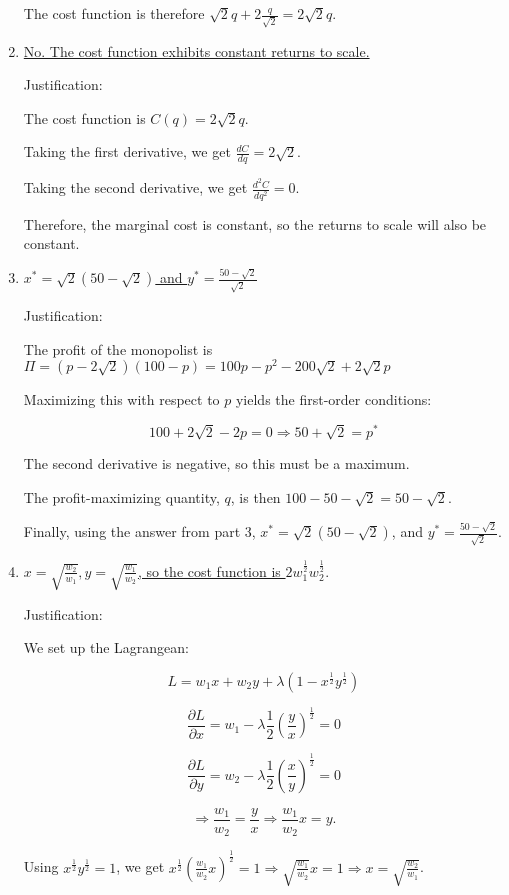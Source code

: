 \documentclass{article}
\newenvironment{solution}{\color{red}}{\color{black}}
\begin{document}
\begin{solution}
\begin{enumerate}
The cost function is therefore $\sqrt{2}q+2\frac{q}{\sqrt{2}}=2\sqrt{2}q$. 

\item\underline{No. The cost function exhibits constant returns to scale.}

Justification:

The cost function is $C(q) =2\sqrt{2}q$. 

Taking the first derivative, we get  $\frac{d C}{d q}=2\sqrt{2}.$

Taking the second derivative, we get  $\frac{d^2 C}{d q^2}=0$.

Therefore, the marginal cost is constant, so the returns to scale will also be constant.

\item\underline{$x^{*}=\sqrt{2}(50-\sqrt{2})$ and $y^{*}=\frac{50-\sqrt{2}}{\sqrt{2}}$}

Justification:

The profit of the monopolist is $\Pi=(p-2\sqrt{2})(100-p)=100p-p^2-200\sqrt{2}+2\sqrt{2}p$

Maximizing this with respect to $p$ yields the first-order conditions:

\[ 100+2\sqrt{2}-2p=0 \Rightarrow 50+\sqrt{2}=p^{*} \]

The second derivative is negative, so this must be a maximum.

The profit-maximizing quantity, $q$, is then $100-50-\sqrt{2}=50-\sqrt{2}$.

Finally, using the answer from part 3, $x^{*}=\sqrt{2}(50-\sqrt{2})$, and $y^{*}=\frac{50-\sqrt{2}}{\sqrt{2}}$.

\item\underline{ $x=\sqrt{\frac{w_2}{w_1}}, y=\sqrt{\frac{w_1}{w_2}}$, so the cost function is $2w_1^\frac12 w_2^\frac12. $}

Justification:

We set up the Lagrangean:

\[ L=w_1 x+w_2 y+\lambda\left( 1-x^\frac12 y^\frac12 \right) \]

\[ \frac{\partial L}{\partial x}=w_1-\lambda\frac12\left( \frac{y}{x} \right)^\frac12=0 \]

\[ \frac{\partial L}{\partial y}=w_2-\lambda\frac12\left( \frac{x}{y} \right)^\frac12=0 \]

\[ \Rightarrow \frac{w_1}{w_2}=\frac{y}{x} \Rightarrow \frac{w_1}{w_2}x=y. \]

Using $x^\frac12 y^\frac12=1$, we get $x^\frac12\left( \frac{w_1}{w_2}x \right)^\frac12=1 \Rightarrow  \sqrt{\frac{w_1}{w_2}}x=1 \Rightarrow  x=\sqrt{\frac{w_2}{w_1}}$.


\end{enumerate}
\end{solution}
\end{document}
